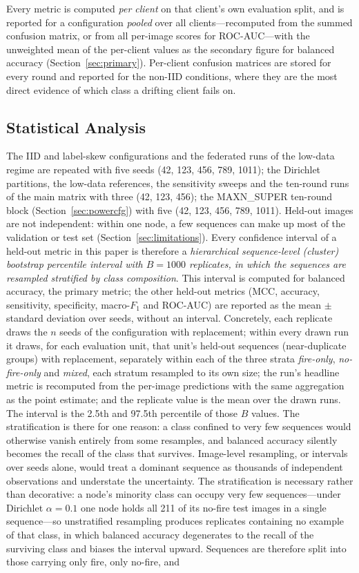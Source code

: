 \documentclass[journal]{IEEEtran}
\begin{document}
Every metric is computed \emph{per client} on that client's own evaluation split, and is reported for a configuration \emph{pooled} over all clients---recomputed from the summed confusion matrix, or from all per-image scores for ROC-AUC---with the unweighted mean of the per-client values as the secondary figure for balanced accuracy (Section~\ref{sec:primary}). Per-client confusion matrices are stored for every round and reported for the non-IID conditions, where they are the most direct evidence of which class a drifting client fails on.

\subsection{Statistical Analysis}
\label{sec:stats}

The IID and label-skew configurations and the federated runs of the low-data regime are repeated with five seeds (42, 123, 456, 789, 1011); the Dirichlet partitions, the low-data references, the sensitivity sweeps and the ten-round runs of the main matrix with three (42, 123, 456); the MAXN\_SUPER ten-round block (Section~\ref{sec:powercfg}) with five (42, 123, 456, 789, 1011). Held-out images are not independent: within one node, a few sequences can make up most of the validation or test set (Section~\ref{sec:limitations}). Every confidence interval of a held-out metric in this paper is therefore a \emph{hierarchical sequence-level (cluster) bootstrap percentile interval with $B=1000$ replicates, in which the sequences are resampled stratified by class composition}. This interval is computed for balanced accuracy, the primary metric; the other held-out metrics (MCC, accuracy, sensitivity, specificity, macro-$F_1$ and ROC-AUC) are reported as the mean $\pm$ standard deviation over seeds, without an interval. Concretely, each replicate draws the $n$ seeds of the configuration with replacement; within every drawn run it draws, for each evaluation unit, that unit's held-out sequences (near-duplicate groups) with replacement, separately within each of the three strata \emph{fire-only}, \emph{no-fire-only} and \emph{mixed}, each stratum resampled to its own size; the run's headline metric is recomputed from the per-image predictions with the same aggregation as the point estimate; and the replicate value is the mean over the drawn runs. The interval is the 2.5th and 97.5th percentile of those $B$ values. The stratification is there for one reason: a class confined to very few sequences would otherwise vanish entirely from some resamples, and balanced accuracy silently becomes the recall of the class that survives. Image-level resampling, or intervals over seeds alone, would treat a dominant sequence as thousands of independent observations and understate the uncertainty. The stratification is necessary rather than decorative: a node's minority class can occupy very few sequences---under Dirichlet $\alpha{=}0.1$ one node holds all 211 of its no-fire test images in a single sequence---so unstratified resampling produces replicates containing no example of that class, in which balanced accuracy degenerates to the recall of the surviving class and biases the interval upward. Sequences are therefore split into those carrying only fire, only no-fire, and 
\end{document}
